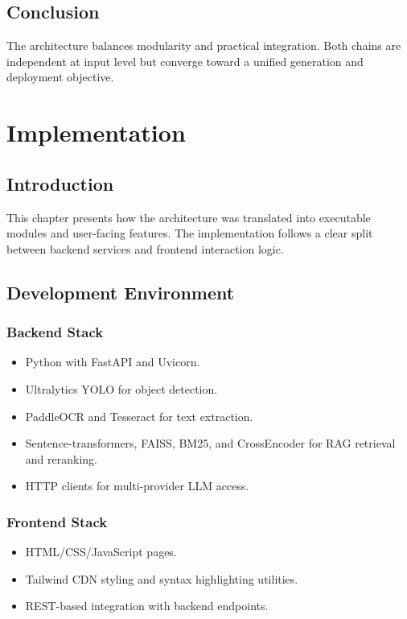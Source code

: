 \documentclass[12pt,a4paper,openany]{report}
\begin{document}
\section{Conclusion}

The architecture balances modularity and practical integration. Both chains are independent at input level but converge toward a unified generation and deployment objective.

\chapter{Implementation}

\section{Introduction}

This chapter presents how the architecture was translated into executable modules and user-facing features. The implementation follows a clear split between backend services and frontend interaction logic.

\section{Development Environment}

\subsection{Backend Stack}

\begin{itemize}
    \item Python with FastAPI and Uvicorn.
    \item Ultralytics YOLO for object detection.
    \item PaddleOCR and Tesseract for text extraction.
    \item Sentence-transformers, FAISS, BM25, and CrossEncoder for RAG retrieval and reranking.
    \item HTTP clients for multi-provider LLM access.
\end{itemize}

\subsection{Frontend Stack}

\begin{itemize}
    \item HTML/CSS/JavaScript pages.
    \item Tailwind CDN styling and syntax highlighting utilities.
    \item REST-based integration with backend endpoints.
\end{itemize}
\end{document}
